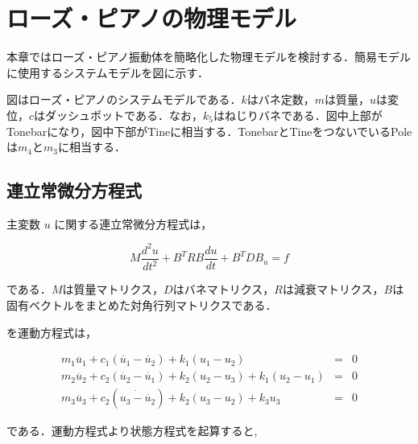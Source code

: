 \section{ローズ・ピアノの物理モデル}

本章ではローズ・ピアノ振動体を簡略化した物理モデルを検討する．簡易モデルに使用するシステムモデルを図に示す．


図はローズ・ピアノのシステムモデルである．$k$はバネ定数，$m$は質量，$u$は変位，$c$はダッシュポットである．なお，$k_5$はねじりバネである．図中上部がTonebarになり，図中下部がTineに相当する．TonebarとTineをつないでいるPoleは$m_4$と$m_3$に相当する．

\subsection{連立常微分方程式}

主変数 $u$ に関する連立常微分方程式は，

\begin{equation}
    M \frac{d^2 u}{dt^2} + B^T R B \frac{du}{dt} + B^T D B_u = f    
\end{equation}

である．$M$は質量マトリクス，$D$はバネマトリクス，$R$は減衰マトリクス，$B$は固有ベクトルをまとめた対角行列マトリクスである．

を運動方程式は，

\begin{eqnarray}
    m_1 \ddot{u_1} + c_1(\dot{u_1} - \dot{u_2}) + k_1 (u_1 - u_2) &=& 0 \\
    m_2 \ddot{u_2} + c_2(\dot{u_2} - \dot{u_1}) + k_2 (u_2 - u_3) + k_1 (u_2 - u_1) &=& 0 \\
    m_3 \ddot{u_3} + c_2(\dot{u_3 - \dot{u_2}}) + k_2 (u_3 - u_2) + k_3 u_3 &=& 0
\end{eqnarray}

である．運動方程式より状態方程式を起算すると,